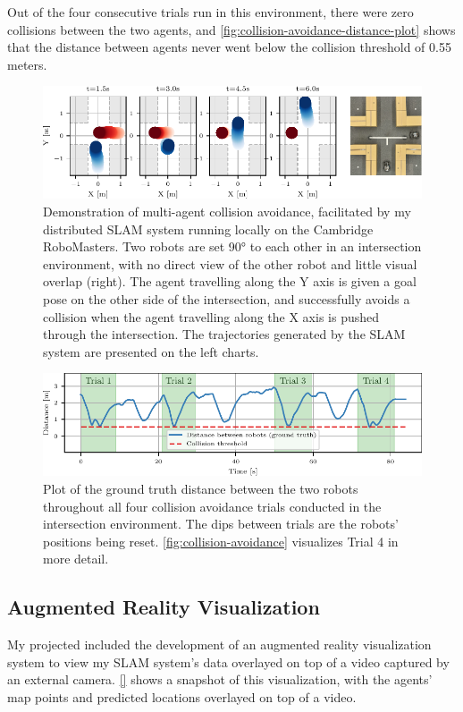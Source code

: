 Out of the four consecutive trials run in this environment, there were zero collisions between the two agents, and \autoref{fig:collision-avoidance-distance-plot} shows that the distance between agents never went below the collision threshold of 0.55 meters.


\begin{figure}[h]
    \centering
    \includegraphics[width=\linewidth]{figures/mar25_1_tracer_graph.pdf}

    \caption{Demonstration of multi-agent collision avoidance, facilitated by my distributed SLAM system running locally on the Cambridge RoboMasters. Two robots are set 90° to each other in an intersection environment, with no direct view of the other robot and little visual overlap (right). The agent travelling along the Y axis is given a goal pose on the other side of the intersection, and successfully avoids a collision when the agent travelling along the X axis is pushed through the intersection. The trajectories generated by the SLAM system are presented on the left charts.}
    \label{fig:collision-avoidance}
\end{figure}

\begin{figure}[h]
    \centering
    \includegraphics[width=\linewidth]{figures/mar25_1_distance_plot.pdf}

    \caption{Plot of the ground truth distance between the two robots throughout all four collision avoidance trials conducted in the intersection environment. The dips between trials are the robots' positions being reset. \autoref{fig:collision-avoidance} visualizes Trial 4 in more detail.}
    \label{fig:collision-avoidance-distance-plot}
\end{figure}

\subsection{Augmented Reality Visualization}
\label{sec:augmented-reality-visualization}

My projected included the development of an augmented reality visualization system to view my SLAM system's data overlayed on top of a video captured by an external camera. \autoref{} shows a snapshot of this visualization, with the agents' map points and predicted locations overlayed on top of a video.
